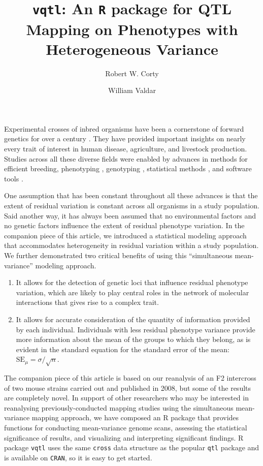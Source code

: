 \documentclass[9pt,twocolumn,twoside]{gsag3jnl}
\title{\texttt{vqtl}: An \texttt{R} package for QTL Mapping on Phenotypes with Heterogeneous Variance}
\author[$\ast$]{Robert W. Corty}
\author[$\ast, 1$]{William Valdar}
\affil[$\ast$]{Department of Genetics, University of North Carolina at Chapel Hill}
\begin{document}
\maketitle
\thispagestyle{firststyle}
\logomark
\articletypemark
\marginmark
\firstpagefootnote
{}
\vspace{-11pt}%

\noindent Experimental crosses of inbred organisms have been a cornerstone of forward genetics for over a century \citep{mendel1866}.
They have provided important insights on nearly every trait of interest in human disease, agriculture, and livestock production.
Studies across all these diverse fields were enabled by advances in methods for efficient breeding, phenotyping \citep{Yang2014a}, genotyping \citep{Williams1990}, statistical methods \citep{Lander1989a}, and software tools \citep{Broman2003}.

One assumption that has been constant throughout all these advances is that the extent of residual variation is constant across all organisms in a study population.
Said another way, it has always been assumed that no environmental factors and no genetic factors influence the extent of residual phenotype variation.
In the companion piece of this article, we introduced a statistical modeling approach that accommodates heterogeneity in residual variation within a study population.
We further demonstrated two critical benefits of using this ``simultaneous mean-variance'' modeling approach.

\begin{enumerate}
	\item It allows for the detection of genetic loci that influence residual phenotype variation, which are likely to play central roles in the network of molecular interactions that gives rise to a complex trait.
	\item It allows for accurate consideration of the quantity of information provided by each individual.  Individuals with less residual phenotype variance provide more information about the mean of the groups to which they belong, as is evident in the standard equation for the standard error of the mean: $\text{SE}_\mu = \sigma/\sqrt{n}$.
\end{enumerate}

The companion piece of this article is based on our reanalysis of an F2 intercross of two mouse strains carried out and published in 2008, but some of the results are completely novel.
In support of other researchers who may be interested in reanalysing previously-conducted mapping studies using the simultaneous mean-variance mapping approach, we have composed an R package that provides functions for conducting mean-variance genome scans, assessing the statistical significance of results, and visualizing and interpreting significant findings.
R package \texttt{vqtl} uses the same \texttt{cross} data structure as the popular \texttt{qtl} package and is available on \texttt{CRAN}, so it is easy to get started.
\end{document}
